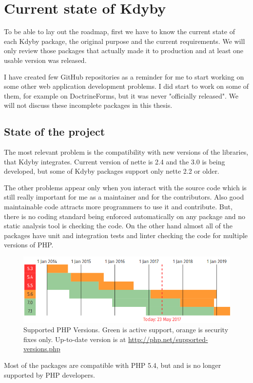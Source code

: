 \chapter{Current state of Kdyby}

To be able to lay out the roadmap, first we have to know the current state of each Kdyby package, the original purpose and the current requirements. We will only review those packages that actually made it to production and at least one usable version was released.

I have created few GitHub repositories as a reminder for me to start working on some other web application development problems. I did start to work on some of them, for example on DoctrineForms, but it was never "officially released". We will not discuss these incomplete packages in this thesis.

\section{State of the project}

The most relevant problem is the compatibility with new versions of the libraries, that Kdyby integrates. Current version of \gls{nette} is 2.4 and the 3.0 is being developed, but some of Kdyby packages support only \gls{nette} 2.2 or older.

The other problems appear only when you interact with the source code which is still really important for me as a maintainer and for the contributors. Also good maintainable code attracts more programmers to use it and contribute. But, there is no coding standard being enforced automatically on any package and no static analysis tool is checking the code. On the other hand almost all of the packages have unit and integration tests and linter checking the code for multiple versions of PHP.

\begin{figure} \label{fig:php:supported-versions}
  \centering
    \includegraphics[width=1\textwidth]{src/assets/php-supported-versions.png}
  \caption{Supported PHP Versions. Green is active support, orange is security fixes only. Up-to-date version is at \url{http://php.net/supported-versions.php}}
\end{figure}
Most of the packages are compatible with PHP 5.4, but  and is no longer supported by PHP developers.


